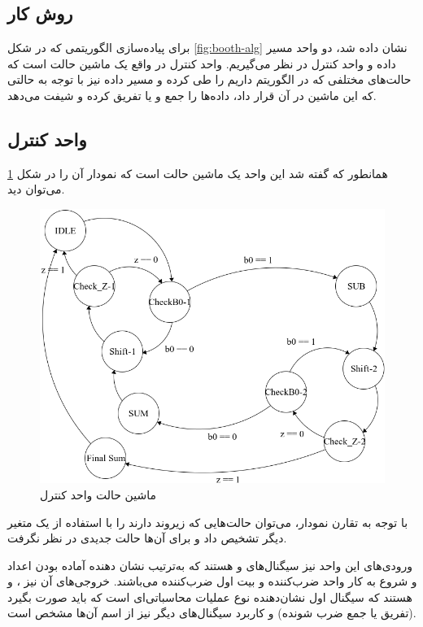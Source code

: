 \documentclass[12pt,onecolumn,a4paper,fleqn]{article}
\begin{document}
	\subsection{روش کار}
	برای پیاده‌سازی الگوریتمی که در شکل \ref{fig:booth-alg} نشان داده شد، دو واحد مسیر داده و واحد کنترل در نظر می‌گیریم. واحد کنترل در واقع یک ماشین حالت است که حالت‌های مختلفی که در الگوریتم داریم را طی کرده و مسیر داده نیز با توجه به حالتی که این ماشین در آن قرار داد، داده‌ها را جمع و یا تفریق کرده و شیفت می‌دهد.
	\subsection{واحد کنترل}
	همانطور که گفته شد این واحد یک ماشین حالت است که نمودار آن را در شکل \ref{fig:state-graph} می‌توان دید.
	\begin{figure}[H]
		\centering
		\includegraphics[scale=0.5]{source/finite-state.png}
		\caption{ماشین حالت واحد کنترل}
		\label{fig:state-graph}
	\end{figure}

	با توجه به تقارن نمودار، می‌توان حالت‌هایی که زیروند دارند را با استفاده از یک متغیر دیگر تشخیص داد و برای آن‌ها حالت جدیدی در نظر نگرفت.
	
	ورودی‌های این واحد نیز سیگنال‌های 
	و
	هستند که به‌ترتیب نشان دهنده آماده بودن اعداد و شروع به کار واحد ضرب‌کننده و بیت اول ضرب‌کننده می‌باشند. خروجی‌‌های آن نیز 
	،
	و
	هستند که سیگنال اول نشان‌دهنده نوع عملیات محاسباتی‌‌ای است که باید صورت بگیرد (تفریق یا جمع ضرب شونده) و کاربرد سیگنال‌های دیگر نیز از اسم آن‌ها مشخص است.
\end{document}
